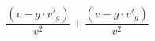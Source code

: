\documentclass[a4paper,12pt]{article}
\begin{document}
$$ \frac{(v - g \cdot v'_{g} )}{v ^{2} }  +  \frac{(v - g \cdot v'_{g} )}{v ^{2} } $$
\end{document}
